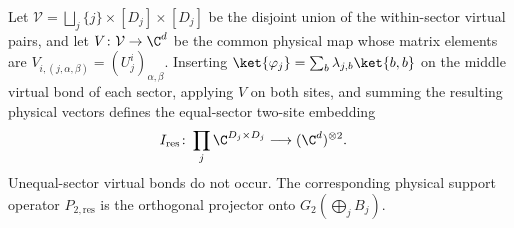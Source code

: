 \begin{definition}
    \label{def:residual_family_two_site_support}
    \leanok
    Let
    $\mathcal V=\bigsqcup_j\{j\}\times[D_j]\times[D_j]$
    be the disjoint union of the within-sector virtual pairs, and let
    $V\colon\mathcal V\to\C^d$ be the common physical map whose matrix
    elements are
    $V_{i,(j,\alpha,\beta)}=(U_j^i)_{\alpha,\beta}$.
    Inserting $\ket{\varphi_j}=\sum_b\lambda_{j,b}\ket{b,b}$ on the middle
    virtual bond of each sector, applying $V$ on both sites, and summing the
    resulting physical vectors defines the equal-sector two-site embedding
    \begin{align}
        I_{\mathrm{res}}\colon
        \prod_j\C^{D_j\times D_j}
         & \longrightarrow
        (\C^d)^{\otimes2}.
        \notag
    \end{align}
    Unequal-sector virtual bonds do not occur. The corresponding physical
    support operator $P_{2,\mathrm{res}}$ is the orthogonal projector onto
    $G_2(\bigoplus_j B_j)$.
\end{definition}

